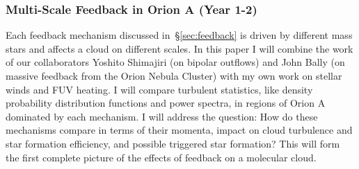 \subsubsection{Multi-Scale Feedback in Orion A (Year 1-2)}\label{sec:paper2}
        Each feedback mechanism discussed in~\S\ref{sec:feedback} is driven by different mass stars and affects a cloud on different scales. In this paper I will combine the work of our collaborators Yoshito Shimajiri (on bipolar outflows) and John Bally (on massive feedback from the Orion Nebula Cluster) with my own work on stellar winds and FUV heating. I will compare turbulent statistics, like density probability distribution functions and power spectra, in regions of Orion A dominated by each mechanism. I will address the question: How do these mechanisms compare in terms of their momenta, impact on cloud turbulence and star formation efficiency, and possible triggered star formation? This will form the first complete picture of the effects of feedback on a molecular cloud.
